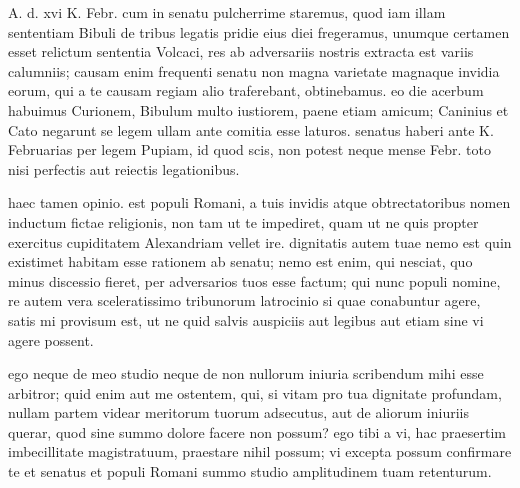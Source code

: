 


 A. d. xvi K. Febr. cum in senatu pulcherrime staremus, quod iam illam sententiam Bibuli de tribus legatis pridie eius diei fregeramus, unumque certamen esset relictum sententia Volcaci, res ab adversariis nostris extracta est variis calumniis; causam enim frequenti senatu non magna varietate magnaque invidia eorum, qui a te causam regiam alio traferebant, obtinebamus. eo die acerbum habuimus Curionem, Bibulum multo iustiorem, paene etiam amicum; Caninius et Cato negarunt se legem ullam ante comitia esse laturos. senatus haberi ante K. Februarias per legem Pupiam, id quod scis, non potest neque mense Febr. toto nisi perfectis aut reiectis legationibus.

 haec tamen opinio. est populi Romani, a tuis invidis atque obtrectatoribus nomen inductum fictae religionis, non tam ut te impediret, quam ut ne quis propter exercitus cupiditatem Alexandriam vellet ire. dignitatis autem tuae nemo est quin existimet habitam esse rationem ab senatu; nemo est enim, qui nesciat, quo minus discessio fieret, per adversarios tuos esse factum; qui nunc populi nomine, re autem vera sceleratissimo tribunorum latrocinio si quae conabuntur agere, satis mi provisum est, ut ne quid salvis auspiciis aut legibus aut etiam sine vi agere possent.

 ego neque de meo studio neque de non nullorum iniuria scribendum mihi esse arbitror; quid enim aut me ostentem, qui, si vitam pro tua dignitate profundam, nullam partem videar meritorum tuorum adsecutus, aut de aliorum iniuriis querar, quod sine summo dolore facere non possum? ego tibi a vi, hac praesertim imbecillitate magistratuum, praestare nihil possum; vi excepta possum confirmare te et senatus et populi Romani summo studio amplitudinem tuam retenturum.
